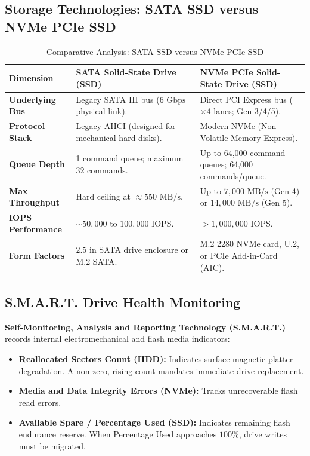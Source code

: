 \subsection{Storage Technologies: SATA SSD versus NVMe PCIe SSD}
\begin{table}[htbp]
\centering
\small
\caption{Comparative Analysis: SATA SSD versus NVMe PCIe SSD}
\label{tab:sata_vs_nvme}
\begin{tabularx}{\textwidth}{l X X}
\toprule
\textbf{Dimension} & \textbf{SATA Solid-State Drive (SSD)} & \textbf{NVMe PCIe Solid-State Drive (SSD)} \\
\midrule
\textbf{Underlying Bus} & Legacy SATA III bus ($6\text{ Gbps}$ physical link). & Direct PCI Express bus ($\times 4$ lanes; Gen 3/4/5). \\
\textbf{Protocol Stack} & Legacy AHCI (designed for mechanical hard disks). & Modern NVMe (Non-Volatile Memory Express). \\
\textbf{Queue Depth} & 1 command queue; maximum 32 commands. & Up to 64,000 command queues; 64,000 commands/queue. \\
\textbf{Max Throughput} & Hard ceiling at $\approx 550\text{ MB/s}$. & Up to $7,000\text{ MB/s}$ (Gen 4) or $14,000\text{ MB/s}$ (Gen 5). \\
\textbf{IOPS Performance} & $\sim 50,000\text{ to } 100,000\text{ IOPS}$. & $>1,000,000\text{ IOPS}$. \\
\textbf{Form Factors} & $2.5\text{ in}$ SATA drive enclosure or M.2 SATA. & M.2 2280 NVMe card, U.2, or PCIe Add-in-Card (AIC). \\
\bottomrule
\end{tabularx}
\end{table}

\subsection{S.M.A.R.T. Drive Health Monitoring}
\textbf{Self-Monitoring, Analysis and Reporting Technology (S.M.A.R.T.)} records internal electromechanical and flash media indicators:
\begin{itemize}
    \item \textbf{Reallocated Sectors Count (HDD):} Indicates surface magnetic platter degradation. A non-zero, rising count mandates immediate drive replacement.
    \item \textbf{Media and Data Integrity Errors (NVMe):} Tracks unrecoverable flash read errors.
    \item \textbf{Available Spare / Percentage Used (SSD):} Indicates remaining flash endurance reserve. When Percentage Used approaches $100\%$, drive writes must be migrated.
\end{itemize}

